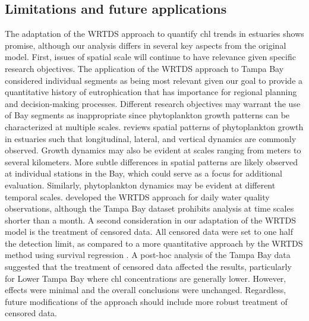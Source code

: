 \documentclass[letterpaper,12pt,oneside]{article}\usepackage[]{graphicx}\usepackage[]{color}
\begin{document}
\subsection{Limitations and future applications}

The adaptation of the \ac{WRTDS} approach to quantify \ac{chl} trends in estuaries shows promise, although our analysis differs in several key aspects from the original model.  First, issues of spatial scale will continue to have relevance given specific research objectives.  The application of the \ac{WRTDS} approach to Tampa Bay considered individual segments as being most relevant given our goal to provide a quantitative history of eutrophication that has importance for regional planning and decision-making processes.  Different research objectives may warrant the use of Bay segments as inappropriate since phytoplankton growth patterns can be characterized at multiple scales.  \citet{Cloern96} reviews spatial patterns of phytoplankton growth in estuaries such that longitudinal, lateral, and vertical dynamics are commonly observed.  Growth dynamics may also be evident at scales ranging from meters to several kilometers.  More subtle differences in spatial patterns are likely observed at individual stations in the Bay, which could serve as a focus for additional evaluation. Similarly, phytoplankton dynamics may be evident at different temporal scales.  \citet{Hirsch10} developed the \ac{WRTDS} approach for daily water quality observations, although the Tampa Bay dataset prohibits analysis at time scales shorter than a month.  A second consideration in our adaptation of the \ac{WRTDS} model is the treatment of censored data.  All censored data were set to one half the detection limit, as compared to a more quantitative approach by the \ac{WRTDS} method using survival regression \citep{Moyer12}.  A post-hoc analysis of the Tampa Bay data suggested that the treatment of censored data affected the results, particularly for Lower Tampa Bay where \ac{chl} concentrations are generally lower.  However, effects were minimal and the overall conclusions were unchanged.  Regardless, future modifications of the approach should include more robust treatment  of censored data.
\end{document}
